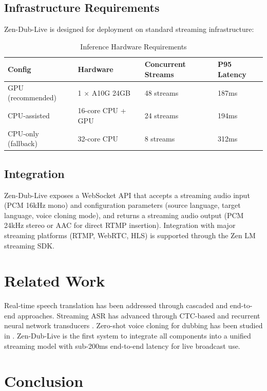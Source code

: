 \documentclass[11pt,a4paper]{article}
\begin{document}
\subsection{Infrastructure Requirements}

Zen-Dub-Live is designed for deployment on standard streaming infrastructure:

\begin{table}[H]
\centering
\caption{Inference Hardware Requirements}
\begin{tabular}{llll}
\toprule
\textbf{Config} & \textbf{Hardware} & \textbf{Concurrent Streams} & \textbf{P95 Latency} \\
\midrule
GPU (recommended) & 1 $\times$ A10G 24GB & 48 streams & 187ms \\
CPU-assisted & 16-core CPU + GPU & 24 streams & 194ms \\
CPU-only (fallback) & 32-core CPU & 8 streams & 312ms \\
\bottomrule
\end{tabular}
\end{table}

\subsection{Integration}

Zen-Dub-Live exposes a WebSocket API that accepts a streaming audio input (PCM 16kHz mono) and configuration parameters (source language, target language, voice cloning mode), and returns a streaming audio output (PCM 24kHz stereo or AAC for direct RTMP insertion). Integration with major streaming platforms (RTMP, WebRTC, HLS) is supported through the Zen LM streaming SDK.

\section{Related Work}

Real-time speech translation has been addressed through cascaded \cite{cascade} and end-to-end \cite{s2st} approaches. Streaming ASR has advanced through CTC-based \cite{ctc} and recurrent neural network transducers \cite{rnnt}. Zero-shot voice cloning for dubbing has been studied in \cite{voiceclone}. Zen-Dub-Live is the first system to integrate all components into a unified streaming model with sub-200ms end-to-end latency for live broadcast use.

\section{Conclusion}
\end{document}
